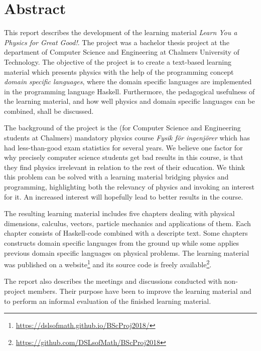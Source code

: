 \setlength{\parskip}{0.5cm}

\thispagestyle{plain}			%
\section*{Abstract}

This report describes the development of the learning material \textit{Learn You a Physics for Great Good!}. The project was a bachelor thesis project at the department of Computer Science and Engineering at Chalmers University of Technology. The objective of the project is to create a text-based learning material which presents physics with the help of the programming concept \textit{domain specific languages}, where the domain specific languages are implemented in the programming language Haskell. Furthermore, the pedagogical usefulness of the learning material, and how well physics and domain specific languages can be combined, shall be discussed.

The background of the project is the (for Computer Science and Engineering students at Chalmers) mandatory physics course \textit{Fysik för ingenjörer} which has had less-than-good exam statistics for several years. We believe one factor for why precisely computer science students get bad results in this course, is that they find physics irrelevant in relation to the rest of their education. We think this problem can be solved with a learning material bridging physics and programming, highlighting both the relevancy of physics and invoking an interest for it. An increased interest will hopefully lead to better results in the course.

The resulting learning material includes five chapters dealing with physical dimensions, calculus, vectors, particle mechanics and applications of them. Each chapter consists of Haskell-code combined with a descripte text. Some chapters constructs domain specific languages from the ground up while some applies previous domain specific languages on physical problems. The learning material was published on a website\footnote{\url{https://dslsofmath.github.io/BScProj2018/}} and its source code is freely available\footnote{\url{https://github.com/DSLsofMath/BScProj2018}}.

The report also describes the meetings and discussions conducted with non-project members. Their purpose have been to improve the learning material and to perform an informal evaluation of the finished learning material.

